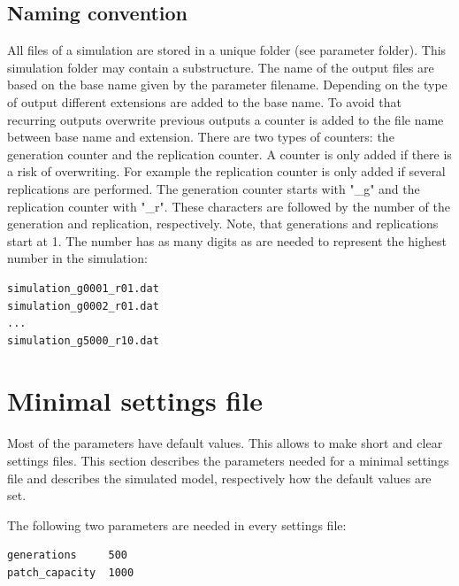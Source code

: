\documentclass[letterpaper,12pt,oneside]{book}
\begin{document}
\subsection{Naming convention}
All files of a simulation are stored in a unique folder (see parameter \textsf{folder}). This simulation folder may contain a substructure. The name of the output files are based on the base name given by the parameter \textsf{filename}. Depending on the type of output different extensions are added to the base name. To avoid that recurring outputs overwrite previous outputs a counter is added to the file name between base name and extension. There are two types of counters: the generation counter and the replication counter. A counter is only added if there is a risk of overwriting. For example the replication counter is only added if several replications are performed. The generation counter starts with "\_g" and the replication counter with "\_r". These characters are followed by the number of the generation and replication, respectively. Note, that generations and replications start at 1. The number has as many digits as are needed to represent the highest number in the simulation: 

\begin{lstlisting}[frame=single]
simulation_g0001_r01.dat
simulation_g0002_r01.dat
...
simulation_g5000_r10.dat
\end{lstlisting}

\section{Minimal settings file}
Most of the parameters have default values. This allows to make short and clear settings files. This section describes the parameters needed for a minimal settings file and describes the simulated model, respectively how the default values are set.

The following two parameters are needed in every settings file:
\begin{lstlisting}[frame=single]
generations     500
patch_capacity  1000
\end{lstlisting}
\end{document}
